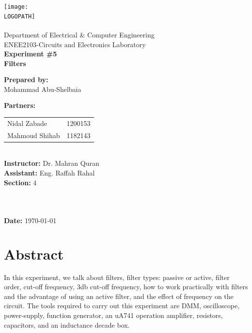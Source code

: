 \documentclass[12pt]{article}
\def \LOGOPATH {assets/birzeit-logo.png}
\def \DEPARTEMENT {Department of Electrical \& Computer Engineering}
\def \COURSENUM {ENEE2103}
\def \COURSENAME {Circuits and Electronics Laboratory}
\def \REPORTTITLE {Filters}
\def \STUDENTNAME {Mohammad Abu-Shelbaia}
\def \PARTNERAN {Nidal Zabade}
\def \PARTNERBN {Mahmoud Shihab}
\def \PARTNERAID {1200153}
\def \PARTNERBID {1182143}
\def \STUDENTID {1200198}
\def \INSTRUCTOR {Dr. Mahran Quran }
\def \ASSISTANT {Eng. Raffah Rahal}
\def \REPORTNUM {5}
\begin{document}
\begin{titlepage}
    \vfill
    \begin{center}
        \texttt{[image: \\LOGOPATH]} \\
        \hfill \\
        \Large{\DEPARTEMENT} \\
        \Large{\COURSENUM\;-\;\COURSENAME} \\
        \vfill
        \textbf{\LARGE{Experiment \#\REPORTNUM}} \\
        \textbf{\LARGE{\REPORTTITLE}}
    \end{center}
    \vfill
    \begin{flushleft}
        \Large{\textbf{Prepared by:}\\ \STUDENTNAME\quad\STUDENTID} \\
        \Large{\textbf{Partners:}\\ 
        \begin{tabular}{@{}l@{\quad}l}
            \PARTNERAN & \PARTNERAID \\
            \PARTNERBN & \PARTNERBID \\
        \end{tabular}} \\
        \Large{\textbf{Instructor:} \INSTRUCTOR} \\
        \Large{\textbf{Assistant:} \ASSISTANT} \\
        \Large{\textbf{Section:} 4}\\
        \LARGE{\textbf{ }}\\
        \LARGE{\textbf{ }}\\
        \LARGE{\textbf{ }}\\
        \Large{\textbf{Date:} \today}\\
    \end{flushleft}
    \vfill
\end{titlepage}

\clearpage
{
\centering
\section*{Abstract}
In this experiment, we talk about filters, filter types: passive or active, filter order, cut-off frequency, 3db cut-off frequency, how to work practically with filters and the advantage of using an active filter, and the effect of frequency on the circuit. The tools required to carry out this experiment are DMM, oscilloscope, power-supply, function generator, an uA741 operation amplifier, resistors, capacitors, and an inductance decade box.
\clearpage
}
\tableofcontents
\clearpage
\setlength{\parskip}{\baselineskip}%
\listoffigures
\clearpage
\listoftables
\clearpage
{}
\end{document}
